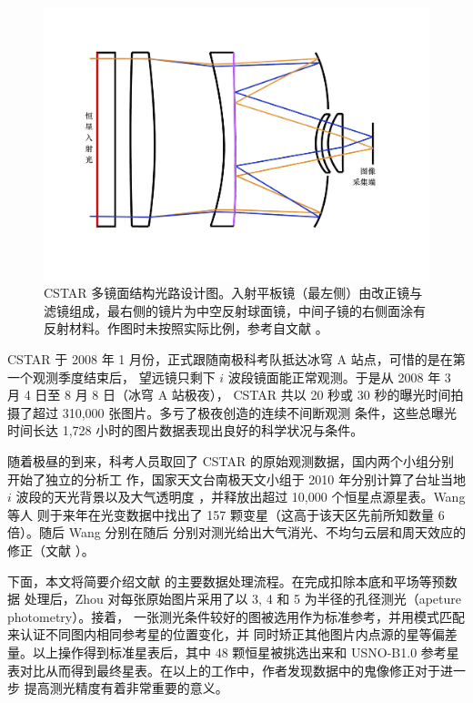 \begin{figure}[t]
\centering
\includegraphics[width=1.0\textwidth]{figures/chapter2/f2_cstaroptics.pdf}
\caption[CSTAR 多镜面结构光路设计图。入射平板镜（最左侧）由改正镜与滤镜组成，最右侧的镜片为中空反射球面镜，中间子镜的右侧面涂有反射材料，该图与实际大小不成比例。]{CSTAR 多镜面结构光路设计图。入射平板镜（最左侧）由改正镜与滤镜组成，最右侧的镜片为中空反射球面镜，中间子镜的右侧面涂有反射材料。作图时未按照实际比例，参考自文献 。}
\label{fig:cstaroptics}
\end{figure}

CSTAR 于 2008 年 1 月份，正式跟随南极科考队抵达冰穹 A 站点，可惜的是在第一个观测季度结束后，
望远镜只剩下 $i$ 波段镜面能正常观测。于是从 2008 年 3 月 4 日至 8 月 8 日（冰穹 A 站极夜），
CSTAR 共以 20 秒或 30 秒的曝光时间拍摄了超过 310,000 张图片。多亏了极夜创造的连续不间断观测
条件，这些总曝光时间长达 1,728 小时的图片数据表现出良好的科学状况与条件。

随着极昼的到来，科考人员取回了 CSTAR 的原始观测数据，国内两个小组分别开始了独立的分析工
作，国家天文台南极天文小组于 2010 年分别计算了台址当地 $i$ 波段的天光背景以及大气透明度
\cite{Zou2010}，并释放出超过 10,000 个恒星点源星表\cite{ZhouX2010b}。Wang 等人\cite{Wang2011}
则于来年在光变数据中找出了 157 颗变星（这高于该天区先前所知数量 6 倍）。随后 Wang 分别在随后
分别对测光给出大气消光、不均匀云层和周天效应的修正（文献 ）。

下面，本文将简要介绍文献 \cite{ZhouX2010b} 的主要数据处理流程。在完成扣除本底和平场等预数据
处理后，Zhou 对每张原始图片采用了以 3, 4 和 5 为半径的孔径测光（apeture photometry）。接着，
一张测光条件较好的图被选用作为标准参考，并用模式匹配来认证不同图内相同参考星的位置变化，并
同时矫正其他图片内点源的星等偏差量。以上操作得到标准星表后，其中 48 颗恒星被挑选出来和 
USNO-B1.0 参考星表对比从而得到最终星表。在以上的工作中，作者发现数据中的鬼像修正对于进一步
提高测光精度有着非常重要的意义。

